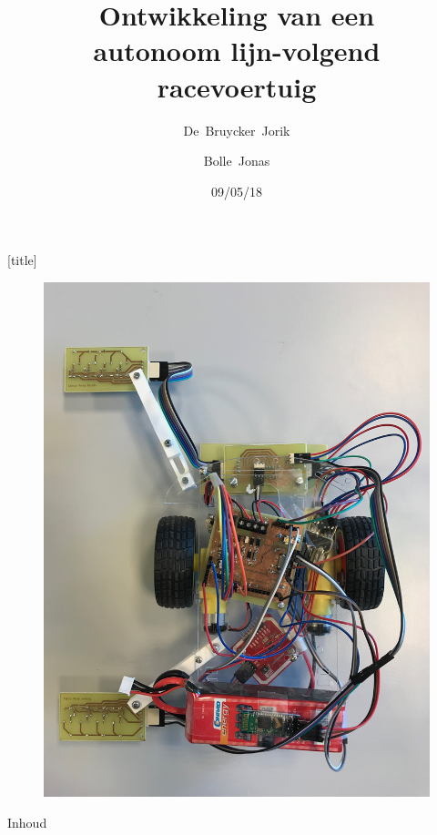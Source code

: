 \documentclass[t,12pt,english
\ifx\beamermode\undefined\else,\beamermode\fi
]{beamer}
\title{Ontwikkeling van een\\autonoom lijn-volgend\\racevoertuig}
\author{\mbox{De Bruycker Jorik} \and \mbox{Bolle Jonas}}
\date{09/05/18}
\institute{3ELICTE}
\begin{document}
[title]

\begin{frame}
    \titlepage
\end{frame}

\usedefaultcanvas

\emptyfooter

\begin{frame}{}
\begin{figure}[H]
	\centering
	\includegraphics[width=\textwidth,height=0.8\textheight,keepaspectratio]{robbie.png}
\end{figure}
\end{frame}

\begin{frame}[noframenumbering]{Inhoud}
        \tableofcontents
\end{frame}
\largefooter

\end{document}
